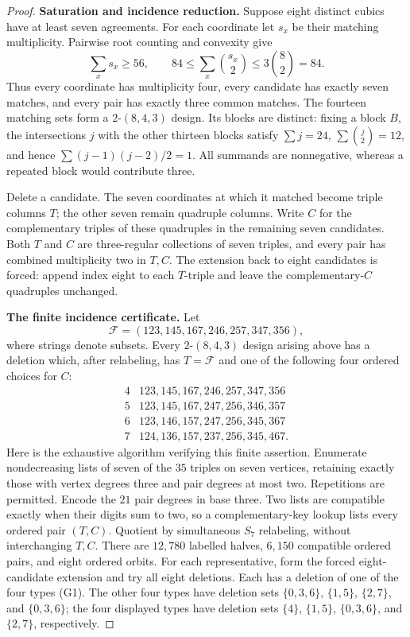 \begin{proof}
\smallskip\noindent\textbf{Saturation and incidence reduction.}
Suppose eight distinct cubics have at least seven agreements.  For each
coordinate let $s_x$ be their matching multiplicity.  Pairwise root
counting and convexity give
\[
 \sum_xs_x\geq56,\qquad
 84\leq\sum_x\binom{s_x}{2}\leq3\binom82=84.
\]
Thus every coordinate has multiplicity four, every candidate has exactly
seven matches, and every pair has exactly three common matches.  The
fourteen matching sets form a $2$-$(8,4,3)$ design.
Its blocks are distinct: fixing a block $B$, the intersections $j$ with
the other thirteen blocks satisfy $\sum j=24$, $\sum\binom j2=12$, and
hence $\sum(j-1)(j-2)/2=1$.  All summands are nonnegative, whereas a
repeated block would contribute three.

Delete a candidate.  The seven coordinates at which it matched become
triple columns $T$; the other seven remain quadruple columns.  Write $C$
for the complementary triples of these quadruples in the remaining
seven candidates.  Both $T$ and $C$ are three-regular collections of
seven triples, and every pair has combined multiplicity two in $T,C$.
The extension back to eight candidates is forced: append index eight to
each $T$-triple and leave the complementary-$C$ quadruples unchanged.

\smallskip\noindent\textbf{The finite incidence certificate.}
Let
\[
 \mathcal F=(123,145,167,246,257,347,356),
\]
where strings denote subsets.  Every $2$-$(8,4,3)$ design arising above
has a deletion which, after relabeling, has $T=\mathcal F$ and one of
the following four ordered choices for $C$:
\[
\begin{array}{c|l}
4&123,145,167,246,257,347,356\\
5&123,145,167,247,256,346,357\\
6&123,146,157,247,256,345,367\\
7&124,136,157,237,256,345,467.
\end{array}                                                    \tag{G1}
\]
Here is the exhaustive algorithm verifying this finite assertion.
Enumerate nondecreasing lists of seven of the $35$ triples on seven
vertices, retaining exactly those with vertex degrees three and pair
degrees at most two.  Repetitions are permitted.  Encode the $21$ pair
degrees in base three.  Two lists are compatible exactly when their
digits sum to two, so a complementary-key lookup lists every ordered
pair $(T,C)$.  Quotient by simultaneous $S_7$ relabeling, without
interchanging $T,C$.  There are $12{,}780$ labelled halves, $6{,}150$
compatible ordered pairs, and eight ordered orbits.  For each
representative, form the forced eight-candidate extension and try all
eight deletions.  Each has a deletion of one of the four types (G1).
The other four types have deletion sets $\{0,3,6\}$, $\{1,5\}$,
$\{2,7\}$, and $\{0,3,6\}$; the four displayed types have deletion
sets $\{4\}$, $\{1,5\}$, $\{0,3,6\}$, and $\{2,7\}$, respectively.


\end{proof}
